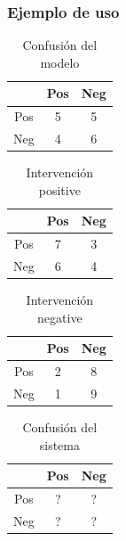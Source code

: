\begin{frame}
\frametitle{Ejemplo de uso}
\begin{minipage}{0.40\textwidth}
\footnotesize
\begin{table}[]
    \begin{tabular}{c|c|c|}
        & Pos & Neg \\ \hline
        Pos & 5 & 5 \\ \hline
        Neg & 4 & 6 \\ \hline
    \end{tabular}
    \caption{Confusi\'on del modelo}
\end{table}
\begin{table}[]
    \begin{tabular}{c|c|c|}
        & Pos & Neg \\ \hline
        Pos & 7 & 3 \\ \hline
        Neg & 6 & 4 \\ \hline
    \end{tabular}
    \caption{Intervenci\'on positive}
\end{table}
\begin{table}[]
    \begin{tabular}{c|c|c|}
        & Pos & Neg \\ \hline
        Pos & 2 & 8 \\ \hline
        Neg & 1 & 9 \\ \hline
    \end{tabular}
    \caption{Intervenci\'on negative}
\end{table}
\end{minipage}
\begin{minipage}{0.16\textwidth}
\end{minipage}
\begin{minipage}{0.40\textwidth}
\begin{table}[]
    \begin{tabular}{c|c|c|}
        & Pos & Neg \\ \hline
        Pos & ? & ? \\ \hline
        Neg & ? & ? \\ \hline
    \end{tabular}
    \caption{Confusi\'on del sistema}
\end{table}
\end{minipage}
\end{frame}



